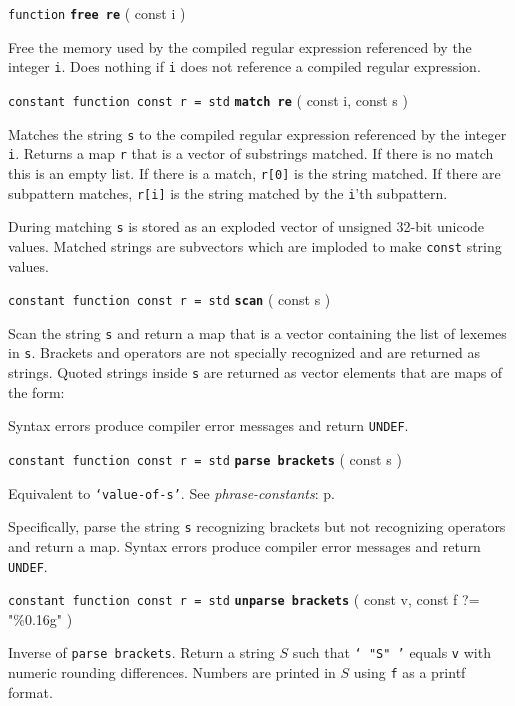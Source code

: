 \documentclass[12pt]{article}
\newcommand{\ttkey}[1]{{\tt \bfseries #1}}
\newcommand{\pagref}[1]{p\pageref{#1}}
\newenvironment{indpar}[1][0.3in]%
	{\begin{list}{}%
		     {\setlength{\itemsep}{0in}%
		      \setlength{\topsep}{0in}%
		      \setlength{\parsep}{1ex}%
		      \setlength{\labelwidth}{#1}%
		      \setlength{\leftmargin}{#1}%
		      \addtolength{\leftmargin}{\labelsep}}%
	 \item}%
	{\end{list}}
\begin{document}
{\tt function} \ttkey{free re} ( const i )
\begin{indpar}
Free the memory used by the compiled regular expression
referenced by the integer {\tt i}.  Does nothing if {\tt i}
does not reference a compiled regular expression.
\end{indpar}

{\tt constant function const r = std} \ttkey{match re} ( const i, const s  )
\begin{indpar}
Matches the string {\tt s} to the compiled regular expression
referenced by the integer {\tt i}.
Returns a map {\tt r} that is a vector of substrings matched.
If there is no match this is an empty list.  If there is
a match, {\tt r[0]} is the string matched.  If there are
subpattern matches, {\tt r[i]} is the string matched by the
{\tt i}'th subpattern.

During matching {\tt s} is stored as an exploded vector of
unsigned 32-bit unicode values.  Matched strings are
subvectors which are imploded to make {\tt const} string values.
\end{indpar}

{\tt constant function const r = std} \ttkey{scan} ( const s  )
\begin{indpar}
Scan the string {\tt s} and return a map that is a vector
containing the list of lexemes in {\tt s}.  Brackets and
operators are not specially recognized and are returned
as strings.  Quoted strings inside {\tt s} are returned
as vector elements that are maps of the form: \\

Syntax errors produce compiler error messages and
return {\tt UNDEF}.
\end{indpar}

{\tt constant function const r = std} \ttkey{parse brackets} ( const s  )
\begin{indpar}
Equivalent to {\tt `{\rm \em value-of-}s'}.
See {\em phrase-constants}: \pagref{PHRASE-CONSTANT}.

Specifically, parse the string {\tt s} recognizing brackets
but not recognizing operators and return a map.
Syntax errors produce compiler error messages and
return {\tt UNDEF}.
\end{indpar}

{\tt constant function const r = std} \ttkey{unparse brackets}
	( const v, const f ?= "\%0.16g"  )
\begin{indpar}
Inverse of {\tt parse brackets}.  Return a string $S$ such
that {\tt ` "$S$" '} equals {\tt v} with numeric rounding differences.
Numbers are printed in $S$ using {\tt f} as a printf format.
\end{indpar}
\end{document}
